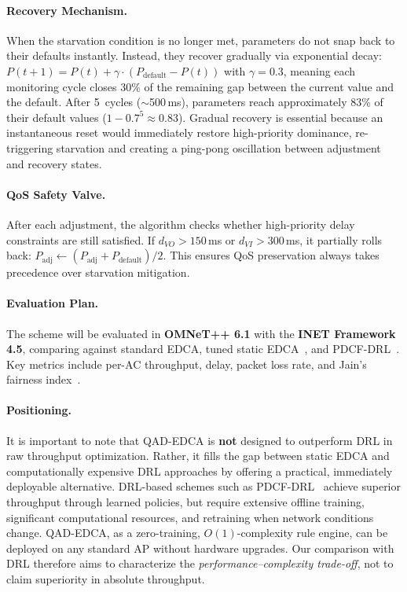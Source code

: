 \documentclass[12pt]{article}
\begin{document}
\paragraph{Recovery Mechanism.}
When the starvation condition is no longer met, parameters
do not snap back to their defaults instantly. Instead, they
recover gradually via exponential decay:
$P(t{+}1) = P(t) + \gamma \cdot (P_{\text{default}} - P(t))$
with $\gamma = 0.3$, meaning each monitoring cycle closes 30\%
of the remaining gap between the current value and the default.
After 5~cycles ($\sim$500\,ms), parameters reach approximately
83\% of their default values ($1 - 0.7^5 \approx 0.83$).
Gradual recovery is essential because an instantaneous reset
would immediately restore high-priority dominance, re-triggering
starvation and creating a ping-pong oscillation between
adjustment and recovery states.

\paragraph{QoS Safety Valve.}
After each adjustment, the algorithm checks whether
high-priority delay constraints are still satisfied. If
$d_{VO} > 150$\,ms or $d_{VI} > 300$\,ms, it partially rolls
back: $P_{\text{adj}} \leftarrow (P_{\text{adj}} +
P_{\text{default}}) / 2$. This ensures QoS preservation always
takes precedence over starvation mitigation.

\paragraph{Evaluation Plan.}
The scheme will be evaluated in \textbf{OMNeT++ 6.1} with the
\textbf{INET Framework 4.5}, comparing against standard EDCA,
tuned static EDCA~\cite{ugwu2022}, and
PDCF-DRL~\cite{zuo2025}. Key metrics include per-AC throughput,
delay, packet loss rate, and Jain's fairness
index~\cite{jain1984}.

\paragraph{Positioning.}
It is important to note that QAD-EDCA is \textbf{not} designed
to outperform DRL in raw throughput optimization. Rather, it
fills the gap between static EDCA and computationally expensive
DRL approaches by offering a practical, immediately deployable
alternative. DRL-based schemes such as
PDCF-DRL~\cite{zuo2025} achieve superior throughput through
learned policies, but require extensive offline training,
significant computational resources, and retraining when network
conditions change. QAD-EDCA, as a zero-training,
$O(1)$-complexity rule engine, can be deployed on any standard
AP without hardware upgrades. Our comparison with DRL therefore
aims to characterize the \emph{performance--complexity
trade-off}, not to claim superiority in absolute throughput.
\end{document}
